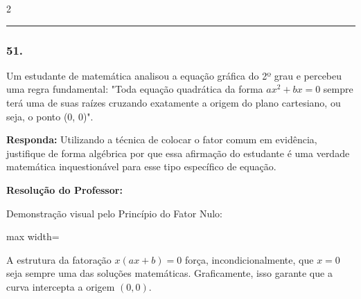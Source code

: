 \begin{multicols*}{2}
\par\vspace{\espacoQuestao}

\noindent\textcolor{CorLinha}{\rule{\linewidth}{0.5pt}} 
\par\vspace{\espacoPreQuestao}
\subsubsection*{51.} Um estudante de matemática analisou a equação gráfica do 2º grau e percebeu uma regra fundamental: "Toda equação quadrática da forma $ ax^2 + bx = 0 $ sempre terá uma de suas raízes cruzando exatamente a origem do plano cartesiano, ou seja, o ponto (0, 0)". 
\begin{boxresponda}
\textbf{Responda:} Utilizando a técnica de colocar o fator comum em evidência, justifique de forma algébrica por que essa afirmação do estudante é uma verdade matemática inquestionável para esse tipo específico de equação.
\end{boxresponda}

\ifgabarito
    \begin{tcolorbox}[colback=CorTitUm!5, colframe=CorTitUm, boxrule=1pt, arc=4pt, left=6pt, right=6pt, top=6pt, bottom=6pt]
    \small\textbf{\textcolor{CorTitUm}{Resolução do Professor:}}\par\vspace{0.1cm}
    \color{CinzaEscuro}
    Demonstração visual pelo Princípio do Fator Nulo:
    \vspace{0.1cm}
    \begin{center}
    \begin{adjustbox}{max width=\linewidth}
    \end{adjustbox}
    \end{center}
    \vspace{0.1cm}
    A estrutura da fatoração $x(ax + b) = 0$ força, incondicionalmente, que $x = 0$ seja sempre uma das soluções matemáticas. Graficamente, isso garante que a curva intercepta a origem $(0,0)$.
    \end{tcolorbox}
\fi


\end{multicols*}
